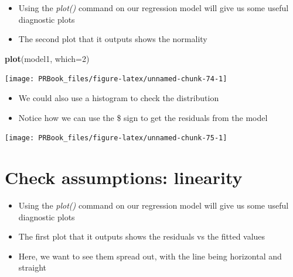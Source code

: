 \documentclass[
]{book}
\newenvironment{Shaded}{\begin{snugshade}}{\end{snugshade}}
\newcommand{\DataTypeTok}[1]{\textcolor[rgb]{0.13,0.29,0.53}{#1}}
\newcommand{\DecValTok}[1]{\textcolor[rgb]{0.00,0.00,0.81}{#1}}
\newcommand{\KeywordTok}[1]{\textcolor[rgb]{0.13,0.29,0.53}{\textbf{#1}}}
\newcommand{\NormalTok}[1]{#1}
\newcommand{\OperatorTok}[1]{\textcolor[rgb]{0.81,0.36,0.00}{\textbf{#1}}}
\providecommand{\tightlist}{%
  \setlength{\itemsep}{0pt}\setlength{\parskip}{0pt}}
\begin{document}
\begin{itemize}
\tightlist
\item
  Using the \emph{plot()} command on our regression model will give us some useful diagnostic plots
\item
  The second plot that it outputs shows the normality
\end{itemize}

\begin{Shaded}
\begin{Highlighting}[]
\KeywordTok{plot}\NormalTok{(model1, }\DataTypeTok{which=}\DecValTok{2}\NormalTok{)}
\end{Highlighting}
\end{Shaded}

\begin{center}\texttt{[image: PRBook\_files/figure-latex/unnamed-chunk-74-1]} \end{center}

\begin{itemize}
\tightlist
\item
  We could also use a histogram to check the distribution
\item
  Notice how we can use the \$ sign to get the residuals from the model
\end{itemize}

\begin{Shaded}
\end{Shaded}

\begin{center}\texttt{[image: PRBook\_files/figure-latex/unnamed-chunk-75-1]} \end{center}

\hypertarget{check-assumptions-linearity}{%
\section{Check assumptions: linearity}\label{check-assumptions-linearity}}

\begin{itemize}
\tightlist
\item
  Using the \emph{plot()} command on our regression model will give us some useful diagnostic plots
\item
  The first plot that it outputs shows the residuals vs the fitted values
\item
  Here, we want to see them spread out, with the line being horizontal and straight
\end{itemize}
\end{document}
